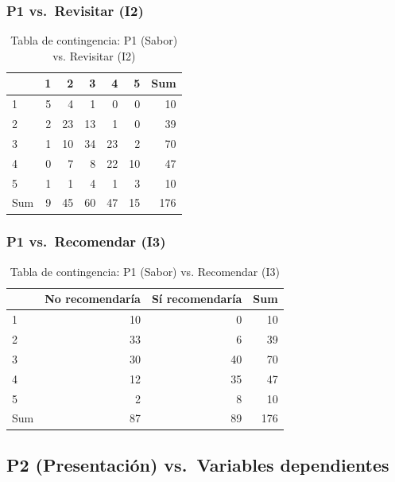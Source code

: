 \documentclass[
  spanish,
]{article}
\begin{document}
\subsubsection{P1 vs.~Revisitar (I2)}\label{p1-vs.-revisitar-i2}

\begin{table}[!h]
\centering
\caption{\label{tab:cont-p1-revis}Tabla de contingencia: P1 (Sabor) vs. Revisitar (I2)}
\centering
\begin{tabular}[t]{lrrrrrr}
\toprule
  & 1 & 2 & 3 & 4 & 5 & Sum\\
\midrule
1 & 5 & 4 & 1 & 0 & 0 & 10\\
2 & 2 & 23 & 13 & 1 & 0 & 39\\
3 & 1 & 10 & 34 & 23 & 2 & 70\\
4 & 0 & 7 & 8 & 22 & 10 & 47\\
5 & 1 & 1 & 4 & 1 & 3 & 10\\
\addlinespace
Sum & 9 & 45 & 60 & 47 & 15 & 176\\
\bottomrule
\end{tabular}
\end{table}

\subsubsection{P1 vs.~Recomendar (I3)}\label{p1-vs.-recomendar-i3}

\begin{table}[!h]
\centering
\caption{\label{tab:cont-p1-recom}Tabla de contingencia: P1 (Sabor) vs. Recomendar (I3)}
\centering
\begin{tabular}[t]{lrrr}
\toprule
  & No recomendaría & Sí recomendaría & Sum\\
\midrule
1 & 10 & 0 & 10\\
2 & 33 & 6 & 39\\
3 & 30 & 40 & 70\\
4 & 12 & 35 & 47\\
5 & 2 & 8 & 10\\
\addlinespace
Sum & 87 & 89 & 176\\
\bottomrule
\end{tabular}
\end{table}

\subsection{P2 (Presentación) vs.~Variables
dependientes}\label{p2-presentaciuxf3n-vs.-variables-dependientes}
\end{document}
